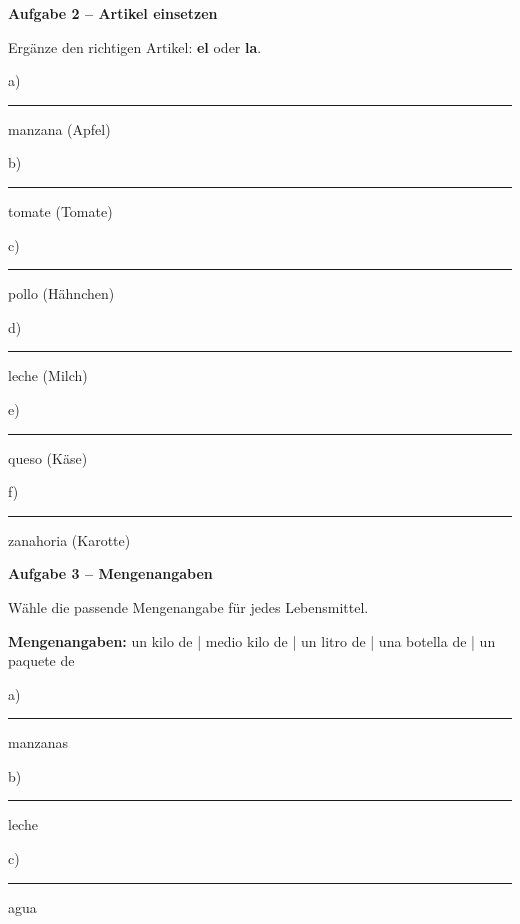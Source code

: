 \documentclass[11pt, a4paper]{article}
\newcommand{\fachfarbe}{spanisch}
\newcommand{\punktebox}[1]{\hfill\fbox{\small \_/#1}}
\newcommand{\luecke}[1]{\rule{#1}{0.4pt}}
\newenvironment{aufgabe}[1]{%
    \needspace{5\baselineskip}%
    \nopagebreak[4]%
    \vspace{10pt}
    \noindent\textbf{\textcolor{\fachfarbe}{Aufgabe #1}}
    \nopagebreak[4]%
    \vspace{5pt}
    \nopagebreak[4]%
    \begin{list}{}{\leftmargin=0pt}
    \item[]
}{%
    \end{list}
}
\newcommand{\es}[1]{\textcolor{\fachfarbe}{\textbf{#1}}}
\begin{document}
\begin{aufgabe}{2 -- Artikel einsetzen}
Ergänze den richtigen Artikel: \es{el} oder \es{la}. \punktebox{6}
\end{aufgabe}

\noindent
a) \luecke{1.5cm} manzana \hfill (Apfel)

\vspace{0.8em}

\noindent
b) \luecke{1.5cm} tomate \hfill (Tomate)

\vspace{0.8em}

\noindent
c) \luecke{1.5cm} pollo \hfill (Hähnchen)

\vspace{0.8em}

\noindent
d) \luecke{1.5cm} leche \hfill (Milch)

\vspace{0.8em}

\noindent
e) \luecke{1.5cm} queso \hfill (Käse)

\vspace{0.8em}

\noindent
f) \luecke{1.5cm} zanahoria \hfill (Karotte)

\vspace{15pt}


\begin{aufgabe}{3 -- Mengenangaben}
Wähle die passende Mengenangabe für jedes Lebensmittel. \punktebox{5}
\end{aufgabe}

\begin{hinweis}
\textbf{Mengenangaben:} un kilo de | medio kilo de | un litro de | una botella de | un paquete de
\end{hinweis}

\vspace{0.5em}

\noindent
a) \luecke{3.5cm} manzanas

\vspace{0.8em}

\noindent
b) \luecke{3.5cm} leche

\vspace{0.8em}

\noindent
c) \luecke{3.5cm} agua

\vspace{0.8em}
\end{document}
